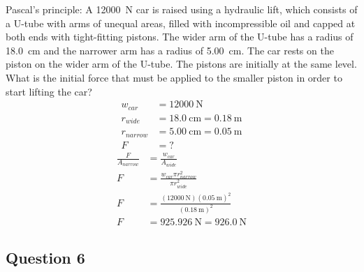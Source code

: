 \documentclass{article}
\begin{document}
Pascal's principle: A \SI{12000}{\newton} car is raised using a hydraulic lift, which consists of a U-tube with arms of unequal areas, filled with incompressible oil and capped at both ends with tight-fitting pistons. The wider arm of the U-tube has a radius of \SI{18.0}{\centi \meter} and the narrower arm has a radius of \SI{5.00}{\centi \meter}. The car rests on the piston on the wider arm of the U-tube. The pistons are initially at the same level. What is the initial force that must be applied to the smaller piston in order to start lifting the car?
\begin{align*}
	w_{car} & = \SI{12000}{\newton} \\
	r_{wide} & = \SI{18.0}{\centi \meter} = \SI{0.18}{\meter} \\
	r_{narrow} & = \SI{5.00}{\centi \meter} = \SI{0.05}{\meter} \\
	F & = ?
\end{align*}
\begin{align*}
	\frac{ F }{ A_{narrow} } & = \frac{ w_{car} }{ A_{wide} } \\
	F & = \frac{ w_{car}\pi r_{narrow}^2 }{ \pi r_{wide}^2 } \\
	F & = \frac{ (\SI{12000}{\newton})(\SI{0.05}{\meter})^2 }{ (\SI{0.18}{\meter})^2 } \\
	F & = \SI{925.926}{\newton} = \SI{926.0}{\newton}
\end{align*}

\subsection{Question 6}
\end{document}
